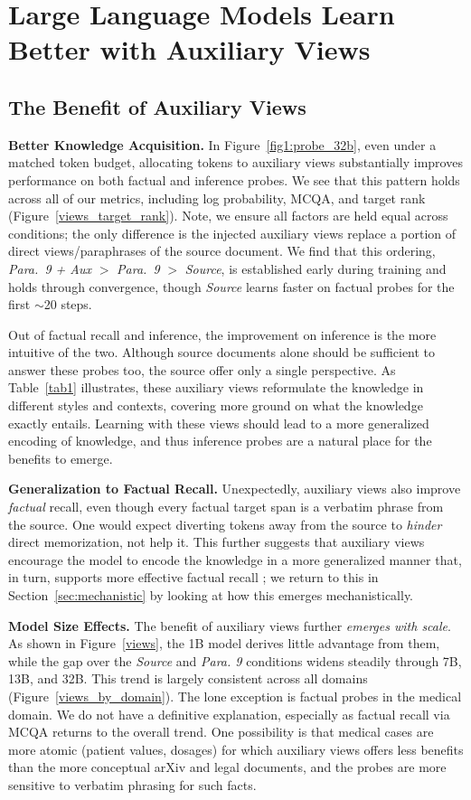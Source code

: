 \documentclass[11pt]{article}
\begin{document}
\section{Large Language Models Learn Better with Auxiliary Views}
\label{aux}
\subsection{The Benefit of Auxiliary Views}

\textbf{Better Knowledge Acquisition.} In Figure~\ref{fig1:probe_32b}, even under a matched token budget, allocating tokens to auxiliary views substantially improves performance on both factual and inference probes. We see that this pattern holds across all of our metrics, including log probability, MCQA, and target rank (Figure~\ref{views_target_rank}). Note, we ensure all factors are held equal across conditions; the only difference is the injected auxiliary views replace a portion of direct views/paraphrases of the source document. We find that this ordering, \textit{Para.\ 9 + Aux} $>$ \textit{Para.\ 9} $>$ \textit{Source}, is established early during training and holds through convergence, though \textit{Source} learns faster on factual probes for the first $\sim$20 steps. 

Out of factual recall and inference, the improvement on inference is the more intuitive of the two. Although source documents alone should be sufficient to answer these probes too, the source offer only a single perspective. As Table~\ref{tab1} illustrates, these auxiliary views reformulate the knowledge in different styles and contexts, covering more ground on what the knowledge exactly entails. Learning with these views should lead to a more generalized encoding of knowledge, and thus inference probes are a natural place for the benefits to emerge.

\textbf{Generalization to Factual Recall.} Unexpectedly, auxiliary views also improve \textit{factual} recall, even though every factual target span is a verbatim phrase from the source. One would expect diverting tokens away from the source to \textit{hinder} direct memorization, not help it. This further suggests that auxiliary views encourage the model to encode the knowledge in a more generalized manner that, in turn, supports more effective factual recall \citep{spiro2017remembering}; we return to this in Section~\ref{sec:mechanistic} by looking at how this emerges mechanistically. 

\textbf{Model Size Effects.} The benefit of auxiliary views further \textit{emerges with scale}. As shown in Figure~\ref{views}, the 1B model derives little advantage from them, while the gap over the \textit{Source} and \textit{Para. 9} conditions widens steadily through 7B, 13B, and 32B. This trend is largely consistent across all domains (Figure~\ref{views_by_domain}). The lone exception is factual probes in the medical domain. We do not have a definitive explanation, especially as factual recall via MCQA returns to the overall trend. One possibility is that medical cases are more atomic (patient values, dosages) for which auxiliary views offers less benefits than the more conceptual arXiv and legal documents, and the probes are more sensitive to verbatim phrasing for such facts.
\end{document}
